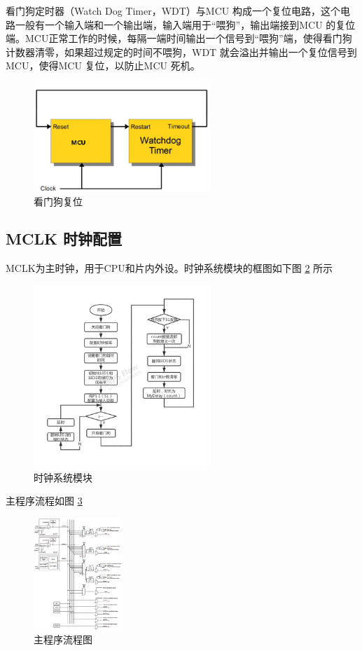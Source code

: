 \documentclass[a4paper,10pt,UTF8]{paper}
\numberwithin{equation}{section}
\numberwithin{figure}{section}
\begin{document}
看门狗定时器（Watch Dog Timer，WDT）与MCU 构成一个复位电路，这个电路一般有一个输入端和一个输出端，输入端用于“喂狗”，输出端接到MCU 的复位端。MCU正常工作的时候，每隔一端时间输出一个信号到“喂狗”端，使得看门狗计数器清零，如果超过规定的时间不喂狗，WDT 就会溢出并输出一个复位信号到MCU，使得MCU 复位，以防止MCU 死机。

\begin{figure}[h]
  \centering
  \includegraphics[width=0.6\textwidth]{2.png}
  \caption{看门狗复位}
  \label{}
\end{figure}


\subsection{MCLK 时钟配置}

MCLK为主时钟，用于CPU和片内外设。时钟系统模块的框图如下图 \ref{fig:3} 所示

\begin{figure}[h]
  \centering
  \includegraphics[width=0.6\textwidth]{3.png}
  \caption{时钟系统模块}
  \label{fig:3}
\end{figure}


主程序流程如图 \ref{fig:4}

\begin{figure}[h]
  \centering
  \includegraphics[width=0.3\textwidth]{4.png}
  \caption{主程序流程图}
  \label{fig:4}
\end{figure}
\end{document}
